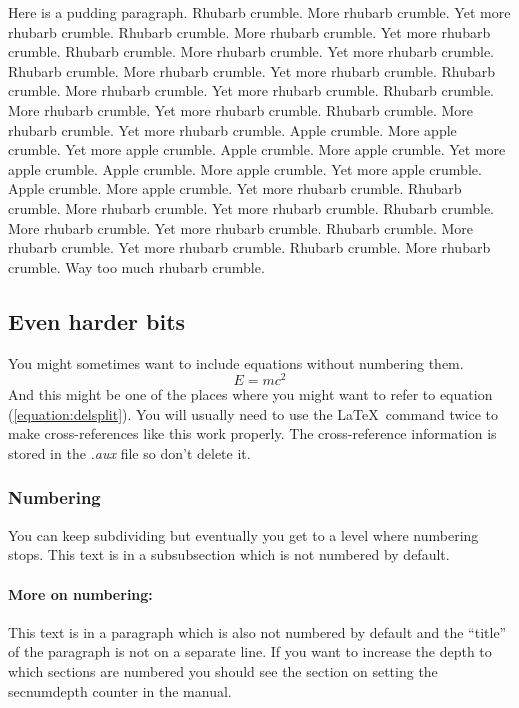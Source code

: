 \documentclass[12pt,a4paper]{report}
\begin{document}
Here is a pudding paragraph.  Rhubarb crumble.  More rhubarb crumble.
Yet more rhubarb crumble.  Rhubarb crumble.  More rhubarb crumble.
Yet more rhubarb crumble.  Rhubarb crumble.  More rhubarb crumble.
Yet more rhubarb crumble.  Rhubarb crumble.  More rhubarb crumble.
Yet more rhubarb crumble.  Rhubarb crumble.  More rhubarb crumble.
Yet more rhubarb crumble.  Rhubarb crumble.  More rhubarb crumble.
Yet more rhubarb crumble.  Rhubarb crumble.  More rhubarb crumble.
Yet more rhubarb crumble.  Apple crumble.  More apple crumble.
Yet more apple crumble.  Apple crumble.  More apple crumble.
Yet more apple crumble.  Apple crumble.  More apple crumble.
Yet more apple crumble.  Apple crumble.  More apple crumble.
Yet more rhubarb crumble.  Rhubarb crumble.  More rhubarb crumble.
Yet more rhubarb crumble.  Rhubarb crumble.  More rhubarb crumble.
Yet more rhubarb crumble.  Rhubarb crumble.  More rhubarb crumble.
Yet more rhubarb crumble.  Rhubarb crumble.  More rhubarb crumble.
Way too much rhubarb crumble.

\subsection{Even harder bits}

You might sometimes want to include equations without numbering them.
\[
  E=mc^{2}
\]
And this might be one of the places where you might want to refer to
equation (\ref{equation:delsplit}). You will usually need to use the
\LaTeX\ command twice to make cross-references like this work properly.
The cross-reference information is stored in the \emph{.aux} file so
don't delete it.

\subsubsection{Numbering}
You can keep subdividing but eventually you get to a level where
numbering stops. This text is in a subsubsection which is not numbered
by default.


\paragraph{More on numbering:}

This text is in a paragraph which is also not numbered by default and
the ``title'' of the paragraph is not on a separate line.
If you want to increase the depth to which sections are numbered you
should see the section on setting the secnumdepth counter in the manual. 
\end{document}
